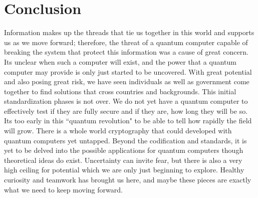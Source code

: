 \graphicspath{{Images/}}

\section{Conclusion}
Information makes up the threads that tie us together in this world and supports us as we move forward; therefore, the threat of a quantum computer capable of breaking the system that protect this information was a cause of great concern. Its unclear when such a computer will exist, and the power that a quantum computer may provide is only just started to be uncovered. With great potential and also posing great risk, we have seen individuals as well as government come together to find solutions that cross countries and backgrounds. This initial standardization phases is not over. We do not yet have a quantum computer to effectively test if they are fully secure and if they are, how long they will be so. Its too early in this ``quantum revolution" to be able to tell how rapidly the field will grow. There is a whole world cryptography that could developed with quantum computers yet untapped. Beyond the codification and standards, it is yet to be delved into the possible applications for quantum computers though theoretical ideas do exist. Uncertainty can invite fear, but there is also a very high ceiling for potential which we are only just beginning to explore. Healthy curiosity and teamwork has brought us here, and maybe these pieces are exactly what we need to keep moving forward.
    